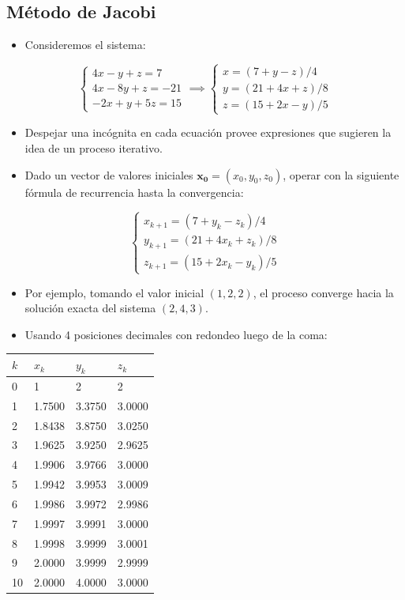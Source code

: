 \documentclass[openany]{book}
\providecommand{\tightlist}{%
  \setlength{\itemsep}{0pt}\setlength{\parskip}{0pt}}
\begin{document}
\hypertarget{muxe9todo-de-jacobi}{%
\subsection{Método de Jacobi}\label{muxe9todo-de-jacobi}}

\begin{itemize}
\tightlist
\item
  Consideremos el sistema:
\end{itemize}

\[
\begin{cases} 
4x-y+z=7 \\
4x-8y+z=-21 \\
-2x+y+5z=15
\end{cases}
\implies
\begin{cases} 
x=(7+y-z)/4 \\
y=(21+4x+z)/8 \\
z=(15+2x-y)/5
\end{cases}
\]

\begin{itemize}
\tightlist
\item
  Despejar una incógnita en cada ecuación provee expresiones que sugieren la idea de un proceso iterativo.
\item
  Dado un vector de valores iniciales \(\mathbf{x_0}=(x_0, y_0, z_0)\), operar con la siguiente fórmula de recurrencia hasta la convergencia:
\end{itemize}

\[
\begin{cases} 
x_{k+1}=(7+y_k-z_k)/4 \\
y_{k+1}=(21+4x_k+z_k)/8 \\
z_{k+1}=(15+2x_k-y_k)/5
\end{cases}
\]

\begin{itemize}
\tightlist
\item
  Por ejemplo, tomando el valor inicial \((1, 2, 2)\), el proceso converge hacia la solución exacta del sistema \((2, 4, 3)\).
\item
  Usando 4 posiciones decimales con redondeo luego de la coma:
\end{itemize}

\begin{longtable}[]{@{}llll@{}}
\toprule
\(k\) & \(x_k\) & \(y_k\) & \(z_k\)\tabularnewline
\midrule
\endhead
0 & 1 & 2 & 2\tabularnewline
1 & 1.7500 & 3.3750 & 3.0000\tabularnewline
2 & 1.8438 & 3.8750 & 3.0250\tabularnewline
3 & 1.9625 & 3.9250 & 2.9625\tabularnewline
4 & 1.9906 & 3.9766 & 3.0000\tabularnewline
5 & 1.9942 & 3.9953 & 3.0009\tabularnewline
6 & 1.9986 & 3.9972 & 2.9986\tabularnewline
7 & 1.9997 & 3.9991 & 3.0000\tabularnewline
8 & 1.9998 & 3.9999 & 3.0001\tabularnewline
9 & 2.0000 & 3.9999 & 2.9999\tabularnewline
10 & 2.0000 & 4.0000 & 3.0000\tabularnewline
\bottomrule
\end{longtable}
\end{document}

